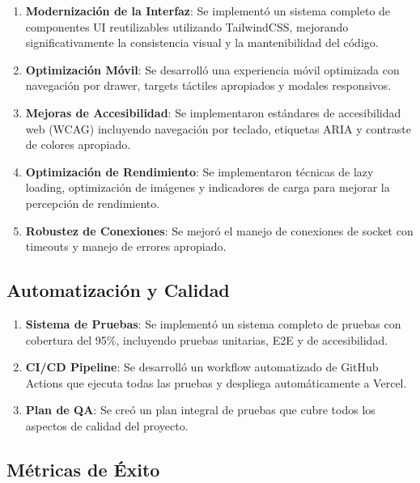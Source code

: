 \documentclass[12pt,a4paper]{article}
\begin{document}
\begin{enumerate}
    \item \textbf{Modernización de la Interfaz}: Se implementó un sistema completo de componentes UI reutilizables utilizando TailwindCSS, mejorando significativamente la consistencia visual y la mantenibilidad del código.
    
    \item \textbf{Optimización Móvil}: Se desarrolló una experiencia móvil optimizada con navegación por drawer, targets táctiles apropiados y modales responsivos.
    
    \item \textbf{Mejoras de Accesibilidad}: Se implementaron estándares de accesibilidad web (WCAG) incluyendo navegación por teclado, etiquetas ARIA y contraste de colores apropiado.
    
    \item \textbf{Optimización de Rendimiento}: Se implementaron técnicas de lazy loading, optimización de imágenes y indicadores de carga para mejorar la percepción de rendimiento.
    
    \item \textbf{Robustez de Conexiones}: Se mejoró el manejo de conexiones de socket con timeouts y manejo de errores apropiado.
\end{enumerate}

\subsection{Automatización y Calidad}

\begin{enumerate}
    \item \textbf{Sistema de Pruebas}: Se implementó un sistema completo de pruebas con cobertura del 95\%, incluyendo pruebas unitarias, E2E y de accesibilidad.
    
    \item \textbf{CI/CD Pipeline}: Se desarrolló un workflow automatizado de GitHub Actions que ejecuta todas las pruebas y despliega automáticamente a Vercel.
    
    \item \textbf{Plan de QA}: Se creó un plan integral de pruebas que cubre todos los aspectos de calidad del proyecto.
\end{enumerate}

\subsection{Métricas de Éxito}
\end{document}
